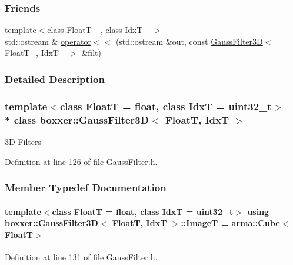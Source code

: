 \subsubsection*{Friends}
\begin{DoxyCompactItemize}
\item 
{\footnotesize template$<$class Float\+T\+\_\+ , class Idx\+T\+\_\+ $>$ }\\std\+::ostream \& \hyperlink{classboxxer_1_1GaussFilter3D_a3e7ff88dad2f821551e56939779d24ba}{operator$<$$<$} (std\+::ostream \&out, const \hyperlink{classboxxer_1_1GaussFilter3D}{Gauss\+Filter3D}$<$ Float\+T\+\_\+, Idx\+T\+\_\+ $>$ \&filt)
\end{DoxyCompactItemize}


\subsubsection{Detailed Description}
\subsubsection*{template$<$class FloatT = float, class IdxT = uint32\+\_\+t$>$\\*
class boxxer\+::\+Gauss\+Filter3\+D$<$ Float\+T, Idx\+T $>$}

3D Filters 

Definition at line 126 of file Gauss\+Filter.\+h.



\subsubsection{Member Typedef Documentation}
\paragraph[{\texorpdfstring{ImageT}{ImageT}}]{\setlength{\rightskip}{0pt plus 5cm}template$<$class FloatT  = float, class IdxT  = uint32\+\_\+t$>$ using {\bf boxxer\+::\+Gauss\+Filter3D}$<$ FloatT, IdxT $>$\+::{\bf ImageT} =  arma\+::\+Cube$<$FloatT$>$}\hypertarget{classboxxer_1_1GaussFilter3D_a62eb2a74863e76bd9237928521185d7a}{}\label{classboxxer_1_1GaussFilter3D_a62eb2a74863e76bd9237928521185d7a}


Definition at line 131 of file Gauss\+Filter.\+h.

